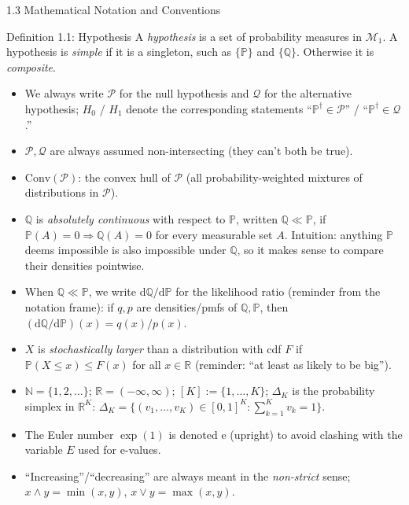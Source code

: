 \documentclass[aspectratio=169,10pt]{beamer}
\begin{document}
\begin{frame}[allowframebreaks]{1.3 Mathematical Notation and Conventions}
\begin{block}{Definition 1.1: Hypothesis}
A \emph{hypothesis} is a set of probability measures in $\mathcal{M}_1$.
A hypothesis is \emph{simple} if it is a singleton, such as $\{\mathbb{P}\}$
and $\{\mathbb{Q}\}$. Otherwise it is \emph{composite}.
\begin{itemize}
  \item We always write $\mathcal{P}$ for the null hypothesis and
    $\mathcal{Q}$ for the alternative hypothesis; $H_0$ / $H_1$ denote the
    corresponding statements ``$\mathbb{P}^{\dagger}\in\mathcal{P}$'' /
    ``$\mathbb{P}^{\dagger}\in\mathcal{Q}$.''
  \item $\mathcal{P},\mathcal{Q}$ are always assumed non-intersecting (they
    can't both be true).
  \item $\mathrm{Conv}(\mathcal{P})$: the convex hull of $\mathcal{P}$
    (all probability-weighted mixtures of distributions in $\mathcal{P}$).
\end{itemize}
\end{block}

\framebreak

\begin{itemize}
  \item $\mathbb{Q}$ is \emph{absolutely continuous} with respect to
    $\mathbb{P}$, written $\mathbb{Q}\ll\mathbb{P}$, if
    $\mathbb{P}(A)=0 \Rightarrow \mathbb{Q}(A)=0$ for every measurable set
    $A$. Intuition: anything $\mathbb{P}$ deems impossible is also
    impossible under $\mathbb{Q}$, so it makes sense to compare their
    densities pointwise.
  \item When $\mathbb{Q}\ll\mathbb{P}$, we write $\mathrm{d}\mathbb{Q}/\mathrm{d}\mathbb{P}$
    for the likelihood ratio (reminder from the notation frame): if $q,p$
    are densities/pmfs of $\mathbb{Q},\mathbb{P}$, then
    $(\mathrm{d}\mathbb{Q}/\mathrm{d}\mathbb{P})(x) = q(x)/p(x)$.
  \item $X$ is \emph{stochastically larger} than a distribution with cdf
    $F$ if $\mathbb{P}(X\le x)\le F(x)$ for all $x\in\mathbb{R}$ (reminder:
    ``at least as likely to be big'').
  \item $\mathbb{N}=\{1,2,\dots\}$; $\mathbb{R}=(-\infty,\infty)$;
    $[K]:=\{1,\dots,K\}$; $\Delta_K$ is the probability simplex in
    $\mathbb{R}^K$:
    $\Delta_K = \{(v_1,\dots,v_K)\in[0,1]^K : \sum_{k=1}^K v_k = 1\}$.
  \item The Euler number $\exp(1)$ is denoted $\mathrm{e}$ (upright) to
    avoid clashing with the variable $E$ used for e-values.
  \item ``Increasing''/``decreasing'' are always meant in the
    \emph{non-strict} sense; $x\wedge y=\min(x,y)$, $x\vee y=\max(x,y)$.
\end{itemize}

\end{frame}
\end{document}
